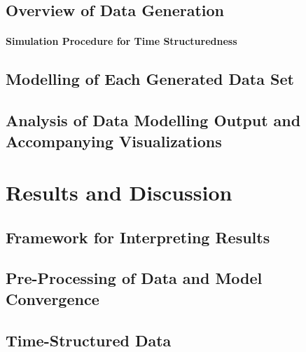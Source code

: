 \documentclass[
12pt, %
twoside,
english]{guelphthesis}
\begin{document}
\hypertarget{overview-of-data-generation-1}{%
\subsection{Overview of Data Generation}\label{overview-of-data-generation-1}}

\hypertarget{simulating-time-struc}{%
\paragraph{Simulation Procedure for Time Structuredness}\label{simulating-time-struc}}

\hypertarget{data-modelling-exp3}{%
\subsection{Modelling of Each Generated Data Set}\label{data-modelling-exp3}}

\hypertarget{analysis-of-data-modelling-output-and-accompanying-visualizations-1}{%
\subsection{Analysis of Data Modelling Output and Accompanying Visualizations}\label{analysis-of-data-modelling-output-and-accompanying-visualizations-1}}

\hypertarget{results-and-discussion-2}{%
\section{Results and Discussion}\label{results-and-discussion-2}}

\hypertarget{framework-for-interpreting-results-2}{%
\subsection{Framework for Interpreting Results}\label{framework-for-interpreting-results-2}}

\hypertarget{pre-processing-of-data-and-model-convergence-2}{%
\subsection{Pre-Processing of Data and Model Convergence}\label{pre-processing-of-data-and-model-convergence-2}}

\hypertarget{concise-example-exp3}{%
\subsection{Time-Structured Data}\label{concise-example-exp3}}
\end{document}
